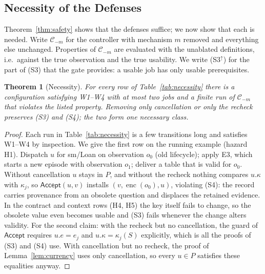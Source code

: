 \documentclass[pdflatex,sn-mathphys-num]{sn-jnl}
\theoremstyle{thmstyleone}%
\newtheorem{theorem}{Theorem}%
\theoremstyle{thmstyletwo}%
\theoremstyle{thmstylethree}%
\newcommand{\key}{\kappa}
\newcommand{\enc}{\operatorname{enc}}
\newcommand{\Acc}{\mathsf{Accept}}
\newcommand{\vw}[1]{\textsf{#1}}
\begin{document}
\subsection{Necessity of the Defenses}\label{sec:necessity}
Theorem~\ref{thm:safety} shows that the defenses suffice; we now show that each is needed. Write $\mathcal C_{-m}$ for the controller with mechanism $m$ removed and everything else unchanged. Properties of $\mathcal C_{-m}$ are evaluated with the unablated definitions, i.e.\ against the true observation and the true usability. We write (S3$^{\uparrow}$) for the part of (S3) that the gate provides: a usable job has only usable prerequisites.

\begin{theorem}[Necessity]\label{thm:necessity}
For every row of Table~\ref{tab:necessity} there is a configuration satisfying W1--W4 with at most two jobs and a finite run of $\mathcal C_{-m}$ that violates the listed property. Removing \emph{only} cancellation or \emph{only} the recheck preserves (S3) and (S4); the two form one necessary class.
\end{theorem}
\begin{proof}
Each run in Table~\ref{tab:necessity} is a few transitions long and satisfies W1--W4 by inspection. We give the first row on the running example (hazard H1). Dispatch $u$ for \vw{sm/Loan} on observation $o_0$ (old lifecycle); apply E3, which starts a new episode with observation $o_1$; deliver a table that is valid for $o_0$. Without cancellation $u$ stays in $P$, and without the recheck nothing compares $u.\key$ with $\key_j$, so $\Acc(u,v)$ installs $(v,\enc(o_0),u)$, violating (S4): the record carries provenance from an obsolete question and displaces the retained evidence. In the contract and context rows (H4, H5) the key itself fails to change, so the obsolete value even becomes usable and (S3) fails whenever the change alters validity.
For the second claim: with the recheck but no cancellation, the guard of $\Acc$ requires $u.e=e_j$ and $u.\key=\key_j(S)$ explicitly, which is all the proofs of (S3) and (S4) use. With cancellation but no recheck, the proof of Lemma~\ref{lem:currency} uses only cancellation, so every $u\in P$ satisfies these equalities anyway.
\end{proof}
\end{document}
